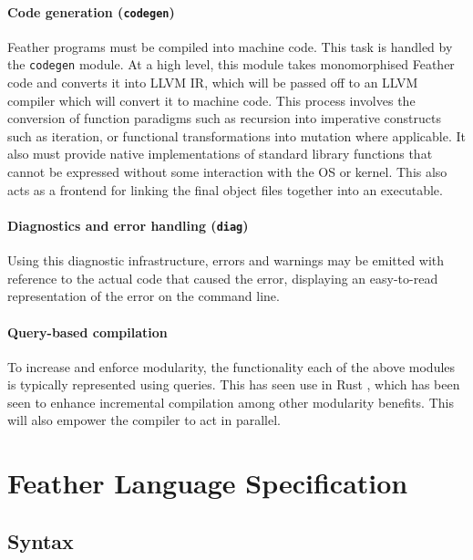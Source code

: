 \documentclass[UKenglish, 11pt, a4paper, parskip=half]{scrbook}
\newcommand{\inlinecode}[1]{\lstinline{#1}}
\begin{document}
\subsection{Code generation (\inlinecode{codegen})}

Feather programs must be compiled into machine code.
This task is handled by the \inlinecode{codegen} module.
At a high level, this module takes monomorphised Feather code and converts it into LLVM IR, which will be passed off to an LLVM compiler which will convert it to machine code.
This process involves the conversion of function paradigms such as recursion into imperative constructs such as iteration, or functional transformations into mutation where applicable.
It also must provide native implementations of standard library functions that cannot be expressed without some interaction with the OS or kernel.
This also acts as a frontend for linking the final object files together into an executable.

\subsection{Diagnostics and error handling (\inlinecode{diag})}

Using this diagnostic infrastructure, errors and warnings may be emitted with reference to the actual code that caused the error, displaying an easy-to-read representation of the error on the command line.

\subsection{Query-based compilation}

To increase and enforce modularity, the functionality each of the above modules is typically represented using queries.
This has seen use in Rust \cite{RustDevGuideOverview}, which has been seen to enhance incremental compilation among other modularity benefits.
This will also empower the compiler to act in parallel.

\mainmatter

\part{Feather Language Specification}

\chapter{Syntax}
\end{document}
